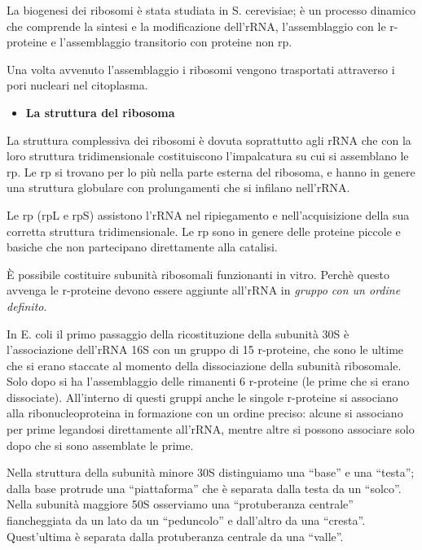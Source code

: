 \documentclass[11pt]{book}
\begin{document}
La biogenesi dei ribosomi è stata studiata in S. cerevisiae; è un
processo dinamico che comprende la sintesi e la modificazione dell'rRNA,
l'assemblaggio con le r-proteine e l'assemblaggio transitorio con
proteine non rp.

Una volta avvenuto l'assemblaggio i ribosomi vengono trasportati
attraverso i pori nucleari nel citoplasma.

\begin{itemize}
\itemsep1pt\parskip0pt
\item
  \textbf{La struttura del ribosoma}
\end{itemize}

La struttura complessiva dei ribosomi è dovuta soprattutto agli rRNA che
con la loro struttura tridimensionale costituiscono l'impalcatura su cui
si assemblano le rp. Le rp si trovano per lo più nella parte esterna del
ribosoma, e hanno in genere una struttura globulare con prolungamenti
che si infilano nell'rRNA.

Le rp (rpL e rpS) assistono l'rRNA nel ripiegamento e nell'acquisizione
della sua corretta struttura tridimensionale. Le rp sono in genere delle
proteine piccole e basiche che non partecipano direttamente alla
catalisi.

È possibile costituire subunità ribosomali funzionanti in vitro. Perchè
questo avvenga le r-proteine devono essere aggiunte all'rRNA in
\emph{gruppo con un ordine definito}.

In E. coli il primo passaggio della ricostituzione della subunità 30S è
l'associazione dell'rRNA 16S con un gruppo di 15 r-proteine, che sono le
ultime che si erano staccate al momento della dissociazione della
subunità ribosomale. Solo dopo si ha l'assemblaggio delle rimanenti 6
r-proteine (le prime che si erano dissociate). All'interno di questi
gruppi anche le singole r-proteine si associano alla ribonucleoproteina
in formazione con un ordine preciso: alcune si associano per prime
legandosi direttamente all'rRNA, mentre altre si possono associare solo
dopo che si sono assemblate le prime.

Nella struttura della subunità minore 30S distinguiamo una ``base'' e
una ``testa''; dalla base protrude una ``piattaforma'' che è separata
dalla testa da un ``solco''. Nella subunità maggiore 50S osserviamo una
``protuberanza centrale'' fiancheggiata da un lato da un ``peduncolo'' e
dall'altro da una ``cresta''. Quest'ultima è separata dalla protuberanza
centrale da una ``valle''.
\end{document}
